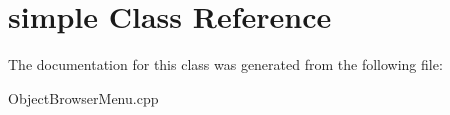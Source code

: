 \hypertarget{classsimple}{
\section{simple Class Reference}
\label{classsimple}
}


The documentation for this class was generated from the following file:\begin{DoxyCompactItemize}
\item 
ObjectBrowserMenu.cpp\end{DoxyCompactItemize}
